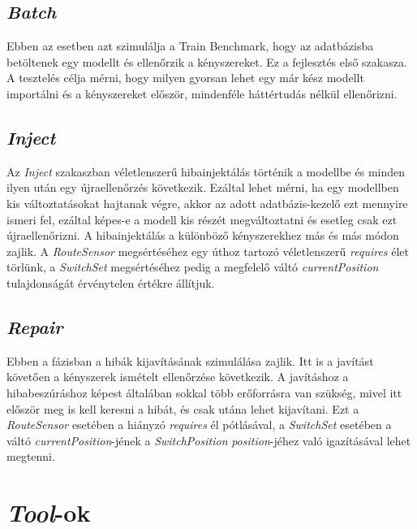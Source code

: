 \subsection{\emph{Batch}}

Ebben az esetben azt szimulálja a Train Benchmark, hogy az adatbázisba betöltenek egy modellt és ellenőrzik a kényszereket. Ez a fejlesztés első szakasza. A tesztelés célja mérni, hogy milyen gyorsan lehet egy már kész modellt importálni és a kényszereket először, mindenféle háttértudás nélkül ellenőrizni.

\subsection{\emph{Inject}}

Az \emph{Inject} szakaszban véletlenszerű hibainjektálás történik a modellbe és minden ilyen után egy újraellenőrzés következik. Ezáltal lehet mérni, ha egy modellben kis változtatásokat hajtanak végre, akkor az adott adatbázis-kezelő ezt mennyire ismeri fel, ezáltal képes-e a modell kis részét megváltoztatni és esetleg csak ezt újraellenőrizni. A hibainjektálás a különböző kényszerekhez más és más módon zajlik. A \emph{RouteSensor} megsértéséhez egy úthoz tartozó véletlenszerű \emph{requires} élet törlünk, a \emph{SwitchSet} megsértéséhez pedig a megfelelő váltó \emph{currentPosition} tulajdonságát érvénytelen értékre állítjuk.

\subsection{\emph{Repair}}

Ebben a fázisban a hibák kijavításának szimulálása zajlik. Itt is a javítást követően a kényszerek ismételt ellenőrzése következik. A javításhoz a hibabeszúráshoz képest általában sokkal több erőforrásra van szükség, mivel itt először meg is kell keresni a hibát, és csak utána lehet kijavítani. Ezt a \emph{RouteSensor} esetében  a hiányzó \emph{requires} él pótlásával, a \emph{SwitchSet} esetében a váltó \emph{currentPosition}-jének a \emph{SwitchPosition} \emph{position}-jéhez való igazításával lehet megtenni.

\section{\emph{Tool}-ok}

